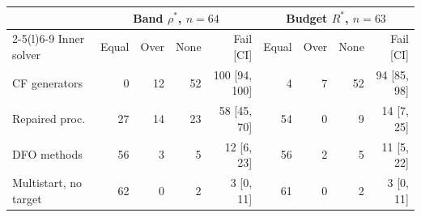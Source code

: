 \begin{tabular}{@{}lrrrrrrrr@{}}
\toprule
 & \multicolumn{4}{c}{Band $\rho^{*}$, $n=64$} & \multicolumn{4}{c}{Budget $R^{*}$, $n=63$} \\
\cmidrule(lr){2-5}\cmidrule(l){6-9}
Inner solver & Equal & Over & None & Fail [CI] & Equal & Over & None & Fail [CI] \\
\midrule
CF generators & 0 & 12 & 52 & 100 [94, 100] & 4 & 7 & 52 & 94 [85, 98] \\
Repaired proc. & 27 & 14 & 23 & 58 [45, 70] & 54 & 0 & 9 & 14 [7, 25] \\
DFO methods & 56 & 3 & 5 & 12 [6, 23] & 56 & 2 & 5 & 11 [5, 22] \\
Multistart, no target & 62 & 0 & 2 & 3 [0, 11] & 61 & 0 & 2 & 3 [0, 11] \\
\bottomrule
\end{tabular}
